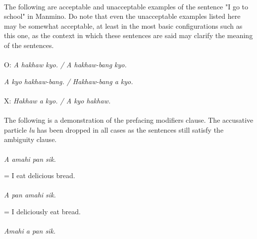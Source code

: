 \documentclass{book}
\begin{document}
        \paragraph{}The following are acceptable and unacceptable examples of the sentence "I go to school" in Manmino. Do note that even the unacceptable examples listed here may be somewhat acceptable, at least in the most basic configurations such as this one, as the context in which these sentences are said may clarify the meaning of the sentences.
        \paragraph{}\hspace{.3in}O: \textit{A hakhaw kyo. / A hakhaw-bang kyo. }
        
        \textit{\hspace{.4in}A kyo hakhaw-bang. / Hakhaw-bang a kyo.}
        
        \paragraph{}\hspace{.3in}X: \textit{Hakhaw a kyo. / A kyo hakhaw.}
        \paragraph{}The following is a demonstration of the prefacing modifiers clause. The accusative particle \textit{lu} has been dropped in all cases as the sentences still satisfy the ambiguity clause.
        \paragraph{}\hspace{.3in}\textit{A amahi pan sik.}  
        
        \hspace{.4in}= I eat delicious bread.
        \paragraph{}\hspace{.3in}\textit{A pan amahi sik.}  
        
        \hspace{.4in}= I deliciously eat bread.
        \paragraph{}\hspace{.3in}\textit{Amahi a pan sik.}  
        
\end{document}
